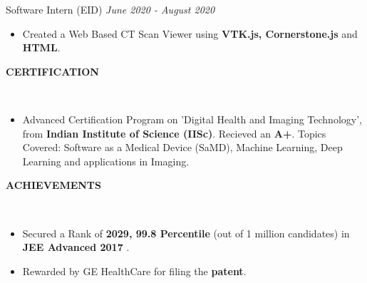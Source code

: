 \documentclass[a4paper,10pt]{article}
\newcommand{\isep}{-2 pt}
\newcommand{\lsep}{-0.6cm}
\newcommand{\resheading}[1]{{\small \colorbox{mygrey}{\begin{minipage}{0.975\textwidth}{\textbf{#1 \vphantom{p\^{E}}}}\end{minipage}}}}
\begin{document}
\begin{itemize}
Software Intern (EID) \hfill \emph{June 2020 - August 2020}
\vspace{-2pt}
	\begin{itemize}\itemsep \isep
	\item  Created a Web Based CT Scan Viewer using \textbf{VTK.js, Cornerstone.js} and \textbf{HTML}.
	\end{itemize}
\end{itemize}
\vspace{-5pt}

\resheading{\textbf{CERTIFICATION} }\\[\lsep]
\vspace{1.0pt}
\begin{itemize} \itemsep \isep
\item Advanced Certification Program on 'Digital Health and Imaging Technology', from \textbf{Indian Institute of Science (IISc)}. Recieved an \textbf{A+}. Topics Covered: Software as a Medical Device (SaMD), Machine Learning, Deep Learning and applications in Imaging.
\end{itemize}

\vspace{-5pt}

\resheading{\textbf{ACHIEVEMENTS} }\\[\lsep]
\vspace{1.0pt}
\begin{itemize} \itemsep \isep
\item Secured a Rank of \textbf{2029, 99.8 Percentile} (out of 1 million candidates) in \textbf{JEE Advanced 2017} .
\item Rewarded by GE HealthCare for filing the \textbf{patent}.
\end{itemize}
\vspace{-5pt}
\end{document}
